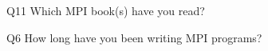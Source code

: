 \begin{description}%
\item{Q11} Which MPI book(s) have you read?%
\item{Q6} How long have you been writing MPI programs?%
\end{description}%
